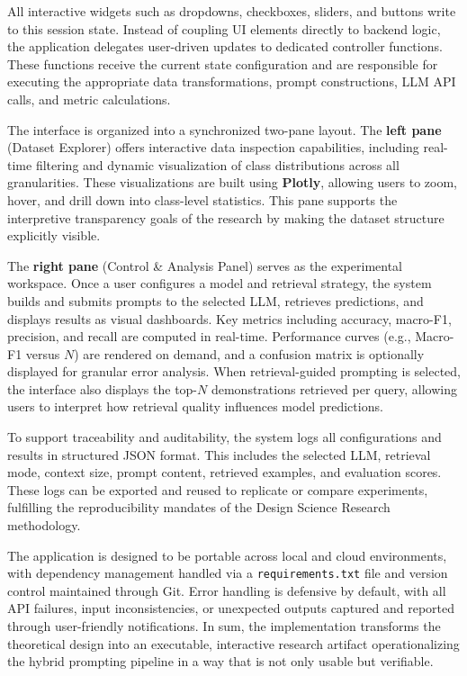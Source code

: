All interactive widgets such as dropdowns, checkboxes, sliders, and buttons write to this session state. Instead of coupling UI elements directly to backend logic, the application delegates user-driven updates to dedicated controller functions. These functions receive the current state configuration and are responsible for executing the appropriate data transformations, prompt constructions, LLM API calls, and metric calculations.

The interface is organized into a synchronized two-pane layout. The \textbf{left pane} (Dataset Explorer) offers interactive data inspection capabilities, including real-time filtering and dynamic visualization of class distributions across all granularities. These visualizations are built using \textbf{Plotly}, allowing users to zoom, hover, and drill down into class-level statistics. This pane supports the interpretive transparency goals of the research by making the dataset structure explicitly visible.

The \textbf{right pane} (Control \& Analysis Panel) serves as the experimental workspace. Once a user configures a model and retrieval strategy, the system builds and submits prompts to the selected LLM, retrieves predictions, and displays results as visual dashboards. Key metrics including accuracy, macro-F1, precision, and recall are computed in real-time. Performance curves (e.g., Macro-F1 versus $N$) are rendered on demand, and a confusion matrix is optionally displayed for granular error analysis. When retrieval-guided prompting is selected, the interface also displays the top-$N$ demonstrations retrieved per query, allowing users to interpret how retrieval quality influences model predictions.

To support traceability and auditability, the system logs all configurations and results in structured JSON format. This includes the selected LLM, retrieval mode, context size, prompt content, retrieved examples, and evaluation scores. These logs can be exported and reused to replicate or compare experiments, fulfilling the reproducibility mandates of the Design Science Research methodology.

The application is designed to be portable across local and cloud environments, with dependency management handled via a \texttt{requirements.txt} file and version control maintained through Git. Error handling is defensive by default, with all API failures, input inconsistencies, or unexpected outputs captured and reported through user-friendly notifications. In sum, the implementation transforms the theoretical design into an executable, interactive research artifact operationalizing the hybrid prompting pipeline in a way that is not only usable but verifiable.

